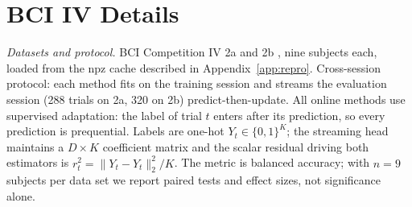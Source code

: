 \documentclass[11pt]{article}
\begin{document}
\section{BCI IV Details}
\label{app:eeg}


\emph{Datasets and protocol.}
BCI Competition IV 2a \citep{brunner2008bci2a} and 2b \citep{leeb2008bci2b}, nine subjects each, loaded from the npz cache described in Appendix~\ref{app:repro}.
Cross-session protocol: each method fits on the training session and streams the evaluation session (288 trials on 2a, 320 on 2b) predict-then-update.
All online methods use supervised adaptation: the label of trial $t$ enters after its prediction, so every prediction is prequential.
Labels are one-hot $Y_t \in \{0,1\}^K$; the streaming head maintains a $D \times K$ coefficient matrix and the scalar residual driving both estimators is $r_t^2 = \|Y_t - \widehat Y_t\|_2^2/K$.
The metric is balanced accuracy; with $n = 9$ subjects per data set we report paired tests and effect sizes, not significance alone.
\end{document}

